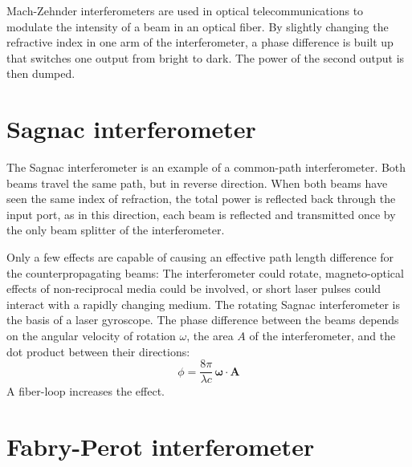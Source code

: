 Mach-Zehnder interferometers are used in optical telecommunications to modulate the intensity of a beam in an optical fiber. By slightly changing the refractive index in one arm of the interferometer, a phase difference is built up that switches one output from bright to dark. The power of the second output is then dumped.

\section{Sagnac interferometer}
The Sagnac interferometer is an example of a common-path interferometer. Both beams travel the same path, but in reverse direction. When both beams have seen the same index of refraction, the total power is reflected back through the input port, as in this direction, each beam is reflected and transmitted once by the only beam splitter of the interferometer.

Only a few effects are capable of causing an effective path length difference for the counterpropagating beams: The interferometer could rotate, magneto-optical effects of non-reciprocal media could be involved, or short laser pulses could interact with a rapidly changing medium. The rotating Sagnac interferometer is the basis of a laser gyroscope. The phase difference between the beams depends on the angular velocity of rotation $\omega$, the area $A$ of the interferometer, and the dot product between their directions:
\begin{equation}
  \phi = \frac{8 \pi}{\lambda c} \, \boldsymbol{\omega} \cdot  \boldsymbol{A}
\end{equation}
A fiber-loop increases the effect.


\section{Fabry-Perot interferometer}


